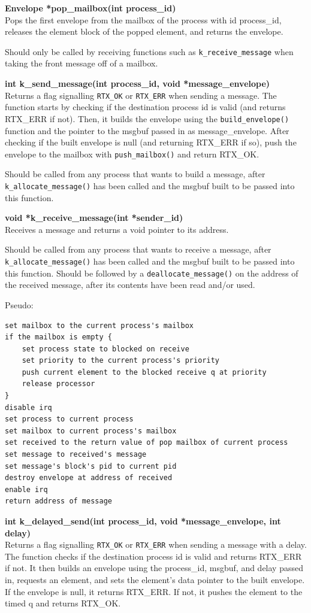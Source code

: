 \documentclass[11pt, oneside]{article}
\begin{document}
{\bf Envelope *pop\_mailbox(int process\_id)}\\
Pops the first envelope from the mailbox of the process with id process\_id, releases the element block of the popped element, and returns the envelope.

Should only be called by receiving functions such as {\tt k\_receive\_message} when taking the front message off of a mailbox.

{\bf int k\_send\_message(int process\_id, void *message\_envelope)}\\
Returns a flag signalling {\tt RTX\_OK} or {\tt RTX\_ERR} when sending a message. The function starts by checking if the destination process id is valid (and returns RTX\_ERR if not). Then, it builds the envelope using the {\tt build\_envelope()} function and the pointer to the msgbuf passed in as message\_envelope. After checking if the built envelope is null (and returning RTX\_ERR if so), push the envelope to the mailbox with {\tt push\_mailbox()} and return RTX\_OK.

Should be called from any process that wants to build a message, after {\tt k\_allocate\_message()} has been called and the msgbuf built to be passed into this function.

{\bf void *k\_receive\_message(int *sender\_id)}\\
Receives a message and returns a void pointer to its address.

Should be called from any process that wants to receive a message, after {\tt k\_allocate\_message()} has been called and the msgbuf built to be passed into this function. Should be followed by a {\tt deallocate\_message()} on the address of the received message, after its contents have been read and/or used.

Pseudo:
\begin{verbatim}
set mailbox to the current process's mailbox
if the mailbox is empty {
    set process state to blocked on receive
    set priority to the current process's priority
    push current element to the blocked receive q at priority
    release processor
}
disable irq
set process to current process
set mailbox to current process's mailbox
set received to the return value of pop mailbox of current process
set message to received's message
set message's block's pid to current pid
destroy envelope at address of received
enable irq
return address of message
\end{verbatim}

{\bf int k\_delayed\_send(int process\_id, void *message\_envelope, int delay)}\\
Returns a flag signalling {\tt RTX\_OK} or {\tt RTX\_ERR} when sending a message with a delay. The function checks if the destination process id is valid and returns RTX\_ERR if not. It then builds an envelope using the process\_id, msgbuf, and delay passed in, requests an element, and sets the element's data pointer to the built envelope. If the envelope is null, it returns RTX\_ERR. If not, it pushes the element to the timed q and returns RTX\_OK.
\end{document}
